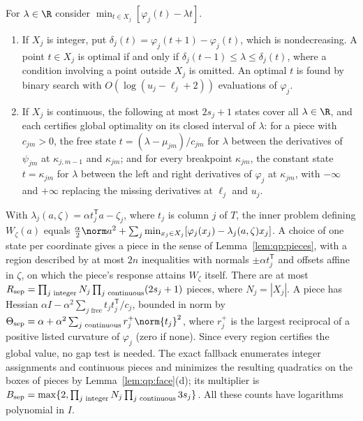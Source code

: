 \begin{lemma}\label{lem:qp:scalar}
For $\lambda\in\R$ consider $\min_{t\in X_j}[\varphi_j(t)-\lambda t]$.
\begin{enumerate}[label=(\alph*)]
\item If $X_j$ is integer, put $\delta_j(t)=\varphi_j(t+1)-\varphi_j(t)$, which
 is nondecreasing. A point $t\in X_j$ is optimal if and only if
 $\delta_j(t-1)\le\lambda\le\delta_j(t)$, where a condition involving a point
 outside $X_j$ is omitted. An optimal $t$ is found by binary search with
 $O(\log(u_j-\ell_j+2))$ evaluations of $\varphi_j$.
\item If $X_j$ is continuous, the following at most $2s_j+1$ states cover all
 $\lambda\in\R$, and each certifies global optimality on its closed interval
 of $\lambda$: for a piece with $c_{jm}>0$, the free state
 $t=(\lambda-\mu_{jm})/c_{jm}$ for $\lambda$ between the derivatives of
 $\psi_{jm}$ at $\kappa_{j,m-1}$ and $\kappa_{jm}$; and for every breakpoint
 $\kappa_{jm}$, the constant state $t=\kappa_{jm}$ for $\lambda$ between the
 left and right derivatives of $\varphi_j$ at $\kappa_{jm}$, with $-\infty$
 and $+\infty$ replacing the missing derivatives at $\ell_j$ and $u_j$.
\end{enumerate}
\end{lemma}

With $\lambda_j(a,\zeta)=\alpha t_j^{\mathsf T} a-\zeta_j$, where $t_j$ is column $j$
of $T$, the inner problem defining $W_\zeta(a)$ equals
$\frac\alpha2\norm a^2+\sum_j\min_{x_j\in X_j}[\varphi_j(x_j)-\lambda_j(a,\zeta)x_j]$.
A choice of one state per coordinate gives a piece in the sense of
Lemma~\ref{lem:qp:pieces}, with a region described by at most $2n$
inequalities with normals $\pm\alpha t_j^{\mathsf T}$ and offsets affine in $\zeta$,
on which the piece's response attains $W_\zeta$ itself. There are at most
$R_{\rm sep}=\prod_{j\text{ integer}}N_j\prod_{j\text{ continuous}}(2s_j+1)$
pieces, where $N_j=|X_j|$. A piece has Hessian
$\alpha I-\alpha^2\sum_{j\text{ free}}t_jt_j^{\mathsf T}/c_j$, bounded in norm by
$\Theta_{\rm sep}=\alpha+\alpha^2\sum_{j\text{ continuous}}r_j^+\norm{t_j}^2$,
where $r_j^+$ is the largest reciprocal of a positive listed curvature of
$\varphi_j$ (zero if none). Since every region certifies the global value, no
gap test is needed. The exact fallback enumerates integer assignments and
continuous pieces and minimizes the resulting quadratics on the boxes of
pieces by Lemma~\ref{lem:qp:face}(d); its multiplier is
$B_{\rm sep}=\max\{2,\prod_{j\text{ integer}}N_j\prod_{j\text{ continuous}}3s_j\}$.
All these counts have logarithms polynomial in $I$.

